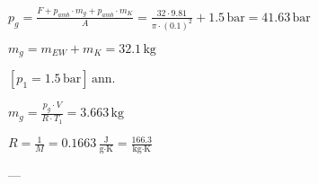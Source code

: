 \( p_g = \frac{F + p_{amb} \cdot m_g + p_{amb} \cdot m_K}{A} = \frac{32 \cdot 9.81}{\pi \cdot (0.1)^2} + 1.5 \, \text{bar} = 41.63 \, \text{bar} \)  

\( m_g = m_{EW} + m_K = 32.1 \, \text{kg} \)  

\( [p_1 = 1.5 \, \text{bar}] \, \text{ann.} \)  

\( m_g = \frac{p_g \cdot V}{R \cdot T_1} = 3.663 \, \text{kg} \)  

\( R = \frac{1}{M} = 0.1663 \, \frac{\text{J}}{\text{g·K}} = \frac{166.3}{\text{kg·K}} \)  

---